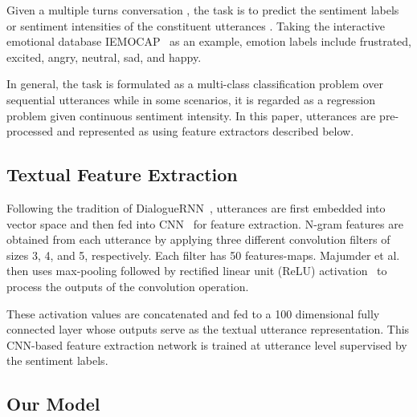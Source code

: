 \documentclass[journal]{IEEEtran}
\begin{document}
Given a multiple turns conversation , the task is to predict the sentiment labels or sentiment intensities of the constituent utterances . Taking the interactive emotional database IEMOCAP~\cite{busso2008iemocap} as an example, emotion labels include frustrated, excited, angry, neutral, sad, and happy.

In general, the task is formulated as a multi-class classification problem over sequential utterances while in some scenarios, it is regarded as a regression problem given continuous sentiment intensity. In this paper, utterances are pre-processed and represented as  using feature extractors described below.

\subsection{Textual Feature Extraction}
\label{sec:feature}
Following the tradition of DialogueRNN~\cite{majumder2019dialoguernn}, utterances are first embedded into vector space and then fed into CNN~\cite{kim2014convolutional} for feature extraction. N-gram features are obtained from each utterance by applying three different convolution filters of sizes 3, 4, and 5, respectively. Each filter has 50 features-maps. Majumder et al.~\cite{majumder2019dialoguernn} then uses max-pooling followed by rectified linear unit (ReLU) activation~\cite{nair2010rectified} to process the outputs of the convolution operation.

These activation values are concatenated and fed to a 100 dimensional fully connected layer whose outputs serve as the textual utterance representation. This CNN-based feature extraction network is trained at utterance level supervised by the sentiment labels.

\subsection{Our Model}
\end{document}
